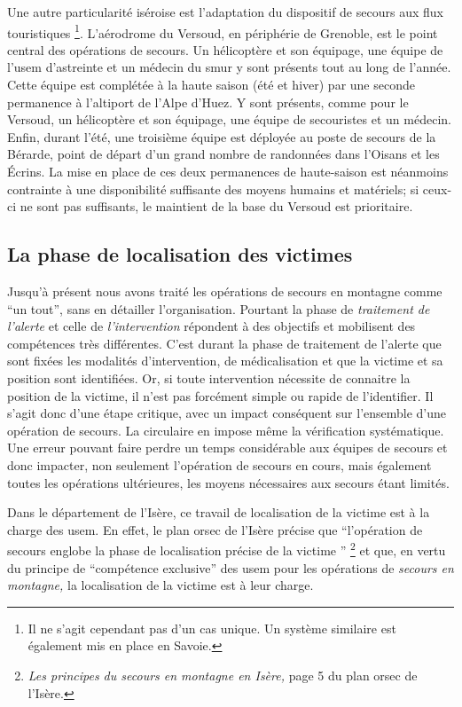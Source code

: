 Une autre particularité iséroise est l'adaptation du dispositif de
secours aux flux touristiques \footnote{Il ne s'agit cependant pas
  d'un cas unique. Un système similaire est également mis en place en
  Savoie.}. L'aérodrome du Versoud, en périphérie de Grenoble, est le
point central des opérations de secours. Un hélicoptère et son
équipage, une équipe de l'\ac{usem} d'astreinte et un médecin du
\ac{smur} y sont présents tout au long de l'année. Cette équipe est
complétée à la haute saison (été et hiver) par une seconde permanence
à l'altiport de l'Alpe d'Huez. Y sont présents, comme pour le Versoud,
un hélicoptère et son équipage, une équipe de secouristes et un
médecin. Enfin, durant l'été, une troisième équipe est déployée au
poste de secours de la Bérarde, point de départ d'un grand nombre de
randonnées dans l'Oisans et les Écrins. La mise en place de ces deux
permanences de haute-saison est néanmoins contrainte à une
disponibilité suffisante des moyens humains et matériels; si ceux-ci
ne sont pas suffisants, le maintient de la base du Versoud est
prioritaire.

\subsection{La phase de localisation des victimes}
\label{susec:1-1-2}

Jusqu'à présent nous avons traité les opérations de secours en
montagne comme \enquote{un tout}, sans en détailler l'organisation.
Pourtant la phase de \emph{traitement de l'alerte} et celle de
\emph{l'intervention} répondent à des objectifs et mobilisent des
compétences très différentes. C'est durant la phase de traitement de
l'alerte que sont fixées les modalités d'intervention, de
médicalisation et que la victime et sa position sont identifiées. Or,
si toute intervention nécessite de connaitre la position de la
victime, il n'est pas forcément simple ou rapide de l'identifier. Il
s'agit donc d'une étape critique, avec un impact conséquent sur
l'ensemble d'une opération de secours. La circulaire  en
impose même la vérification systématique. Une erreur pouvant faire
perdre un temps considérable aux équipes de secours et donc impacter,
non seulement l'opération de secours en cours, mais également toutes
les opérations ultérieures, les moyens nécessaires aux secours étant
limités.

Dans le département de l'Isère, ce travail de localisation de la
victime est à la charge des \ac{usem}. En effet, le plan \ac{orsec} de
l'Isère précise que \enquote{l’opération de secours \textelp{} englobe
  la phase de localisation précise de la victime \textelp{}}
\footnote{\emph{Les principes du secours en montagne en Isère,} page 5
  du plan \ac{orsec} de l'Isère.} et que, en vertu du principe de
\enquote{compétence exclusive} des \ac{usem} pour les opérations de
\emph{secours en montagne,} la localisation de la victime est à leur
charge.

